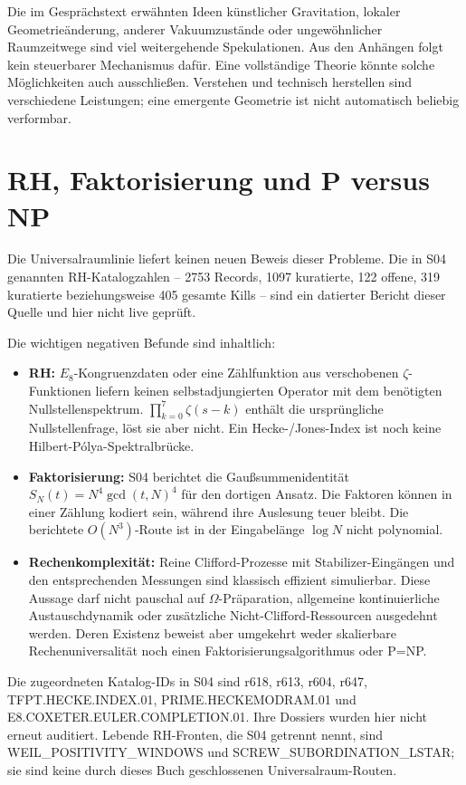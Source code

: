 Die im Gesprächstext erwähnten Ideen künstlicher Gravitation, lokaler Geometrieänderung, anderer Vakuumzustände oder ungewöhnlicher Raumzeitwege sind viel weitergehende Spekulationen. Aus den Anhängen folgt kein steuerbarer Mechanismus dafür. Eine vollständige Theorie könnte solche Möglichkeiten auch ausschließen. Verstehen und technisch herstellen sind verschiedene Leistungen; eine emergente Geometrie ist nicht automatisch beliebig verformbar.

\section{RH, Faktorisierung und P versus NP}
Die Universalraumlinie liefert keinen neuen Beweis dieser Probleme. Die in S04 genannten RH-Katalogzahlen -- 2753 Records, 1097 kuratierte, 122 offene, 319 kuratierte beziehungsweise 405 gesamte Kills -- sind ein datierter Bericht dieser Quelle und hier nicht live geprüft.

Die wichtigen negativen Befunde sind inhaltlich:
\begin{itemize}
\item \textbf{RH:} $E_8$-Kongruenzdaten oder eine Zählfunktion aus verschobenen $\zeta$-Funktionen liefern keinen selbstadjungierten Operator mit dem benötigten Nullstellenspektrum. $\prod_{k=0}^7\zeta(s-k)$ enthält die ursprüngliche Nullstellenfrage, löst sie aber nicht. Ein Hecke-/Jones-Index ist noch keine Hilbert-Pólya-Spektralbrücke.
\item \textbf{Faktorisierung:} S04 berichtet die Gaußsummenidentität $S_N(t)=N^4\gcd(t,N)^4$ für den dortigen Ansatz. Die Faktoren können in einer Zählung kodiert sein, während ihre Auslesung teuer bleibt. Die berichtete $O(N^3)$-Route ist in der Eingabelänge $\log N$ nicht polynomial.
\item \textbf{Rechenkomplexität:} Reine Clifford-Prozesse mit Stabilizer-Eingängen und den entsprechenden Messungen sind klassisch effizient simulierbar. Diese Aussage darf nicht pauschal auf $\Omega$-Präparation, allgemeine kontinuierliche Austauschdynamik oder zusätzliche Nicht-Clifford-Ressourcen ausgedehnt werden. Deren Existenz beweist aber umgekehrt weder skalierbare Rechenuniversalität noch einen Faktorisierungsalgorithmus oder P=NP.
\end{itemize}
Die zugeordneten Katalog-IDs in S04 sind r618, r613, r604, r647, TFPT.HECKE.INDEX.01, PRIME.HECKEMODRAM.01 und E8.COXETER.EULER.COMPLETION.01. Ihre Dossiers wurden hier nicht erneut auditiert. Lebende RH-Fronten, die S04 getrennt nennt, sind WEIL\_POSITIVITY\_WINDOWS und SCREW\_SUBORDINATION\_LSTAR; sie sind keine durch dieses Buch geschlossenen Universalraum-Routen.

